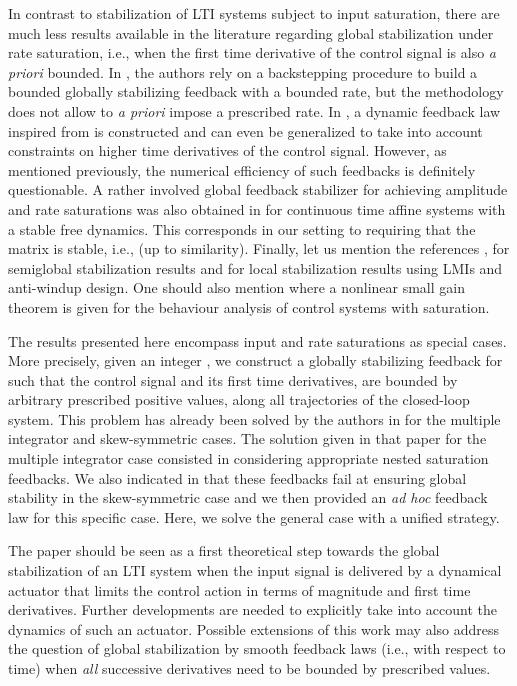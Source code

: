 \documentclass[letterpaper, 10pt]{article}
\begin{document}
In contrast to stabilization of LTI systems subject to input saturation, there are much less results available in the literature regarding global stabilization under rate saturation, i.e., when the first time derivative of the control signal is also {\it a priori} bounded. In \cite{Freeman:1998tp}, the authors rely on a backstepping procedure to build a bounded globally stabilizing feedback with a bounded rate, but the methodology does not allow to {\it a priori} impose a prescribed rate. In \cite{SFbound}, a dynamic feedback law inspired from \cite{Megretski96bibooutput} is constructed
and can even be generalized to take into account constraints on higher time derivatives of the control signal. However, as mentioned previously, the numerical efficiency of such feedbacks is definitely questionable.  A rather involved global feedback stabilizer for  achieving amplitude and rate saturations was also obtained in \cite{SoSuAL} for continuous time affine systems with a stable free dynamics. This corresponds in our setting to requiring that the matrix  is stable, i.e.,  (up to similarity). Finally, let us mention the references \cite{lauvdal97}, \cite{lin1997semi} for semiglobal stabilization results and \cite{SilvaTarbouch03} for local stabilization results using LMIs and anti-windup design. One should also mention \cite{teel1996nonlinear} where a nonlinear small gain theorem is given for the behaviour analysis of control systems with saturation.

The results presented here encompass input and rate saturations as special cases. More precisely, given an integer , we construct a globally stabilizing feedback for  such that the control signal and its  first time derivatives, are bounded by arbitrary prescribed positive values, along all trajectories of the closed-loop system. This problem has already been solved by the authors in \cite{LCC1} for the multiple integrator and skew-symmetric cases. The solution given in that paper for the multiple integrator case consisted in considering appropriate nested saturation feedbacks. We also indicated in \cite{LCC1} that these feedbacks fail at ensuring global stability in the skew-symmetric case and we then provided an {\it ad hoc} feedback law for this specific case. Here, we solve the general case with a unified strategy.


The paper should be seen as a first theoretical step towards the global stabilization of an LTI system when the input signal is delivered by a dynamical actuator that limits the control action in terms of magnitude and  first time derivatives. Further developments are needed to explicitly take into account the dynamics of such an actuator. Possible extensions of this work may also address the question of global stabilization by smooth feedback laws (i.e.,  with respect to time) when \emph{all} successive derivatives need to be bounded by prescribed values.
\end{document}
